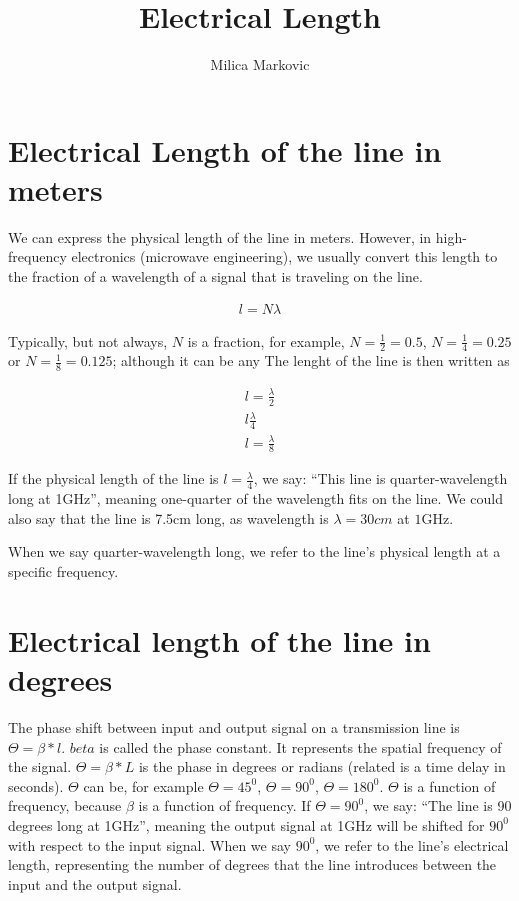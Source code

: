 \documentclass{ximera}
\title{Electrical Length}
\author{Milica Markovic}
\begin{document}
  
\begin{abstract}  

\end{abstract}  
\maketitle    





\section{Electrical Length of the line in meters}

We can express the physical length of the line in meters. However, in high-frequency electronics (microwave engineering), we usually convert this length to the fraction of a wavelength of a signal that is traveling on the line. 


\begin{eqnarray}
 l=N \lambda 
\end{eqnarray}
 

Typically, but not always, $N$ is a fraction, for example,  $N=\frac{1}{2}=0.5$, $N=\frac{1}{4}=0.25$ or $N=\frac{1}{8}=0.125$; although it can be any  The lenght of the line is then written as


\begin{eqnarray}
 l=\frac{\lambda}{2}  \\
 l\frac{\lambda}{4}  \\
  l=\frac{\lambda}{8}  
\end{eqnarray}
 


If the physical length of the line is $l=\frac{\lambda}{4}$, we say: “This line is quarter-wavelength long at 1GHz”, meaning one-quarter of the wavelength fits on the line. We could also say that the line is 7.5cm long, as wavelength is $\lambda=30 \unit{cm}$ at $1$GHz.


When we say quarter-wavelength long, we refer to the line’s physical length at a specific frequency. 

\section{Electrical length of the line in degrees}

The phase shift between input and output signal on a transmission line is  
$\Theta=\beta*l$.
$beta$ is called the phase constant. It represents the spatial frequency of the signal.
$\Theta=\beta*L$ is the phase in degrees or radians (related is a time delay in seconds).
$\Theta$  can be, for example $\Theta = 45^0$, $\Theta = 90^0$, $\Theta = 180^0$. $\Theta$ is a function of frequency, because $\beta$ is a function of frequency.
 If $\Theta = 90^0$, we say: “The line is 90 degrees long at 1GHz”, meaning the output signal at 1GHz will be shifted for $90^0$ with respect to the input signal. 
When we say $90^0$, we refer to the line’s electrical length, representing the number of degrees that the line introduces between the input and the output signal.
\end{document}
